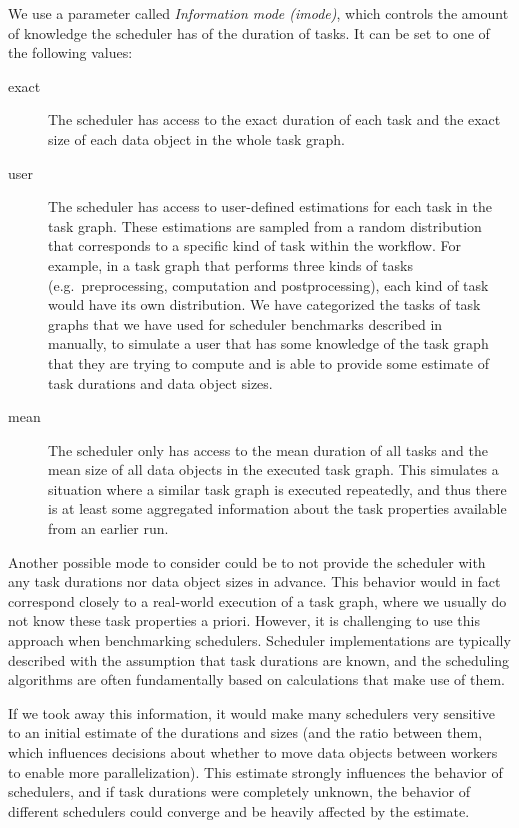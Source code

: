 \begin{description}[wide=0pt]
		We use a parameter called \emph{Information mode (imode)}, which controls the amount of knowledge the
		scheduler has of the duration of tasks. It can be set to one of the following values:
		\begin{description}
			\item[exact] The scheduler has access to the exact duration of each task and the exact size of each data object
				in the whole task graph.
			\item[user] The scheduler has access to user-defined estimations for each task in the task graph. These
				estimations are sampled from a random distribution that corresponds to a specific kind of task
				within the workflow. For example, in a task graph that performs three kinds of tasks (e.g.\
				preprocessing, computation and postprocessing), each kind of task would have its own distribution.
				We have categorized the tasks of task graphs that we have used for scheduler benchmarks described
				in~\Autoref{sec:estee-benchmarks} manually, to simulate a user that has some knowledge of the task graph
				that they are trying to compute and is able to provide some estimate of task durations and data
				object sizes.
			\item[mean] The scheduler only has access to the mean duration of all tasks and the mean size of all data
				objects in the executed task graph. This simulates a situation where a similar task graph is
				executed repeatedly, and thus there is at least some aggregated information about the task
				properties available from an earlier run.
		\end{description}
		Another possible mode to consider could be to not provide the scheduler with any task durations nor
		data object sizes in advance. This behavior would in fact correspond closely to a real-world
		execution of a task graph, where we usually do not know these task properties a priori. However, it
		is challenging to use this approach when benchmarking schedulers. Scheduler implementations are
		typically described with the assumption that task durations are known, and the scheduling
		algorithms are often fundamentally based on calculations that make use of them.

		If we took away this information, it would make many schedulers very sensitive to an initial
		estimate of the durations and sizes (and the ratio between them, which influences decisions about whether
		to move data objects between workers to enable more parallelization). This estimate strongly
		influences the behavior of schedulers, and if task durations were completely unknown, the
		behavior of different schedulers could converge and be heavily affected by the estimate.


\end{description}
